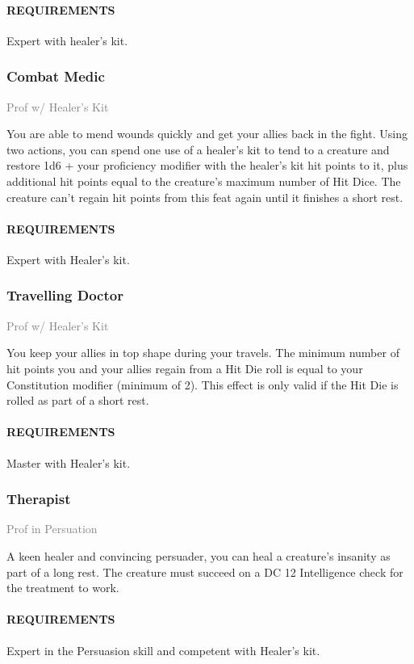     \paragraph{REQUIREMENTS} Expert with healer's kit.

    \subsubsection{Combat Medic} \label{feat::combatmedic}
    \small{\textcolor{gray}{Prof w/ Healer's Kit}}

    \normalsize
    You are able to mend wounds quickly and get your allies back in the fight.
    Using two actions, you can spend one use of a healer's kit to tend to a creature and restore 1d6 + your proficiency modifier with the healer's kit hit points to it, plus additional hit points equal to the creature's maximum number of Hit Dice.
    The creature can't regain hit points from this feat again until it finishes a short rest.
    \paragraph{REQUIREMENTS} Expert with Healer's kit.

    \subsubsection{Travelling Doctor} \label{feat::travellingdoctor}
    \small{\textcolor{gray}{Prof w/ Healer's Kit}}

    \normalsize
    You keep your allies in top shape during your travels.
    The minimum number of hit points you and your allies regain from a Hit Die roll is equal to your Constitution modifier (minimum of 2).
    This effect is only valid if the Hit Die is rolled as part of a short rest.
    \paragraph{REQUIREMENTS} Master with Healer's kit.

    \subsubsection{Therapist} \label{feat::therapist}
    \small{\textcolor{gray}{Prof in Persuation}}

    \normalsize
    A keen healer and convincing persuader, you can heal a creature's insanity as part of a long rest.
    The creature must succeed on a DC 12 Intelligence check for the treatment to work.
    \paragraph{REQUIREMENTS} Expert in the Persuasion skill and competent with Healer's kit.
